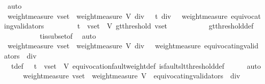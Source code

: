 \begin{isabellebody}
\ auto\isanewline
\ \ \isamarkupfalse%
\ \isamarkupfalse%
\ {\isachardoublequoteopen}weight{\isacharunderscore}measure\ v{\isacharunderscore}set\ {\isachargreater}\ {\isacharparenleft}weight{\isacharunderscore}measure\ V{\isacharparenright}\ div\ {}\ {\isacharplus}\ t\ div\ {}\ {\isacharminus}\ weight{\isacharunderscore}measure\ {\isacharparenleft}equivocating{\isacharunderscore}validators\ {\isasymsigma}{\isacharparenright}{\isachardoublequoteclose}\isanewline
\ \ \ \ \isamarkupfalse%
\ {\isacartoucheopen}{\isasymsigma}\ {\isasymin}\ {\isasymSigma}t\ {\isasymand}\ v{\isacharunderscore}set\ {\isasymsubseteq}\ V{\isacartoucheclose}\ {\isacartoucheopen}gt{\isacharunderscore}threshold\ {\isacharparenleft}v{\isacharunderscore}set{\isacharcomma}\ {\isasymsigma}{\isacharparenright}{\isacartoucheclose}\isanewline
\ \ \ \ \ \ \ \ \ \ gt{\isacharunderscore}threshold{\isacharunderscore}def\isanewline
\ \ \ \ \ \ \ \ \ \ {\isasymSigma}t{\isacharunderscore}is{\isacharunderscore}subset{\isacharunderscore}of{\isacharunderscore}{\isasymSigma}\ \isamarkupfalse%
\ auto\isanewline
\ \ \isamarkupfalse%
\ \isamarkupfalse%
\ {\isachardoublequoteopen}weight{\isacharunderscore}measure\ v{\isacharunderscore}set\ {\isachargreater}\ {\isacharparenleft}weight{\isacharunderscore}measure\ V{\isacharparenright}\ div\ {}\ {\isacharminus}\ weight{\isacharunderscore}measure\ {\isacharparenleft}equivocating{\isacharunderscore}validators\ {\isasymsigma}{\isacharparenright}\ div\ {}{\isachardoublequoteclose}\isanewline
\ \ \ \ \isamarkupfalse%
\ \ {\isasymSigma}t{\isacharunderscore}def\ {\isacartoucheopen}{\isasymsigma}\ {\isasymin}\ {\isasymSigma}t\ {\isasymand}\ v{\isacharunderscore}set\ {\isasymsubseteq}\ V{\isacartoucheclose}\ equivocation{\isacharunderscore}fault{\isacharunderscore}weight{\isacharunderscore}def\ is{\isacharunderscore}faults{\isacharunderscore}lt{\isacharunderscore}threshold{\isacharunderscore}def\isanewline
\ \ \ \ \isamarkupfalse%
\ auto\isanewline
\ \ \isamarkupfalse%
\ \isamarkupfalse%
\ {\isachardoublequoteopen}weight{\isacharunderscore}measure\ v{\isacharunderscore}set\ {\isachargreater}\ {\isacharparenleft}weight{\isacharunderscore}measure\ {\isacharparenleft}V\ {\isacharminus}\ equivocating{\isacharunderscore}validators\ {\isasymsigma}{\isacharparenright}{\isacharparenright}\ div\ {}{\isachardoublequoteclose}\isanewline
\ \ \ \ \isamarkupfalse%

\end{isabellebody}

